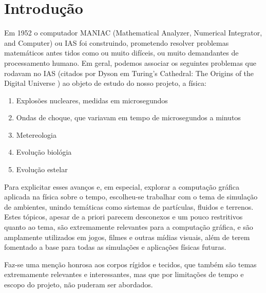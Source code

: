 \section{Introdução}
Em 1952 o computador MANIAC (Mathematical Analyzer, Numerical Integrator, and Computer) ou IAS foi construindo, prometendo resolver problemas matemáticos antes tidos como ou muito difíceis, ou muito demandantes de processamento humano. Em geral, podemos associar os seguintes problemas que rodavam no IAS (citados por Dyson em Turing’s Cathedral: The Origins of the Digital Universe \cite{dyson2012turing}) ao objeto de estudo do nosso projeto, a física:

\begin{enumerate}
\item Explosões nucleares, medidas em microsegundos
\item Ondas de choque, que variavam em tempo de microsegundos a minutos
\item Metereologia
\item Evolução biológia 
\item Evolução estelar
\end{enumerate}

Para explicitar esses avanços e, em especial, explorar a computação gráfica aplicada na física sobre o tempo, escolheu-se trabalhar com o tema de simulação de ambientes, unindo temáticas como sistemas de partículas, fluidos e terrenos. Estes tópicos, apesar de a priori parecem desconexos e um pouco restritivos quanto ao tema, são extremamente relevantes para a computação gráfica, e são amplamente utilizados em jogos, filmes e outras mídias visuais, além de terem fomentado a base para todas as simulações e aplicações físicas futuras.  

Faz-se uma menção honrosa aos corpos rígidos e tecidos, que também são temas extremamente relevantes e interessantes, mas que por limitações de tempo e escopo do projeto, não puderam ser abordados.
